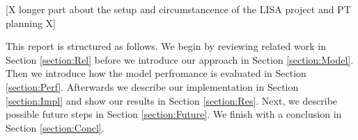 
[X longer part about the setup and circumstancence of the LISA project and PT planning X]

This report is structured as follows. We begin by reviewing related work in Section \ref{section:Rel} before we introduce our approach in Section \ref{section:Model}. Then we introduce how the model perfromance is evaluated in Section \ref{section:Perf}. Afterwards we describe our implementation in Section \ref{section:Impl} and show our results in Section \ref{section:Res}. Next, we describe possible future steps in Section \ref{section:Future}. We finish with a conclusion in Section \ref{section:Concl}.

